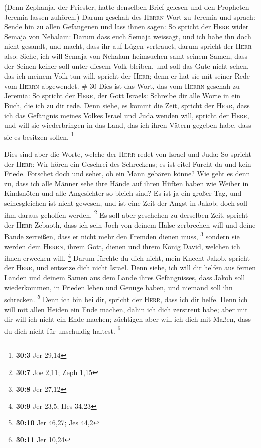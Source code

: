  (Denn Zephanja, der Priester, hatte denselben Brief
gelesen und den Propheten Jeremia lassen zuhören.)  Darum
geschah des \textsc{Herrn} Wort zu Jeremia und sprach: 
Sende hin zu allen Gefangenen und lass ihnen sagen: So spricht der
\textsc{Herr} wider Semaja von Nehalam: Darum dass euch Semaja weissagt,
und ich habe ihn doch nicht gesandt, und macht, dass ihr auf Lügen
vertrauet,  darum spricht der \textsc{Herr} also: Siehe,
ich will Semaja von Nehalam heimsuchen samt seinem Samen, dass der
Seinen keiner soll unter diesem Volk bleiben, und soll das Gute nicht
sehen, das ich meinem Volk tun will, spricht der \textsc{Herr}; denn er
hat sie mit seiner Rede vom \textsc{Herrn} abgewendet. \# 30
 Dies ist das Wort, das vom \textsc{Herrn} geschah zu
Jeremia:  So spricht der \textsc{Herr}, der Gott Israels:
Schreibe dir alle Worte in ein Buch, die ich zu dir rede. 
Denn siehe, es kommt die Zeit, spricht der \textsc{Herr}, dass ich das
Gefängnis meines Volkes Israel und Juda wenden will, spricht der
\textsc{Herr}, und will sie wiederbringen in das Land, das ich ihren
Vätern gegeben habe, dass sie es besitzen sollen. \footnote{\textbf{30:3}
  Jer 29,14}

 Dies sind aber die Worte, welche der \textsc{Herr} redet
von Israel und Juda:  So spricht der \textsc{Herr}: Wir
hören ein Geschrei des Schreckens; es ist eitel Furcht da und kein
Friede.  Forschet doch und sehet, ob ein Mann gebären
könne? Wie geht es denn zu, dass ich alle Männer sehe ihre Hände auf
ihren Hüften haben wie Weiber in Kindsnöten und alle Angesichter so
bleich sind?  Es ist ja ein großer Tag, und seinesgleichen
ist nicht gewesen, und ist eine Zeit der Angst in Jakob; doch soll ihm
daraus geholfen werden. \footnote{\textbf{30:7} Joe 2,11; Zeph 1,15}
 Es soll aber geschehen zu derselben Zeit, spricht der
\textsc{Herr} Zebaoth, dass ich sein Joch von deinem Halse zerbrechen
will und deine Bande zerreißen, dass er nicht mehr den Fremden dienen
muss, \footnote{\textbf{30:8} Jer 27,12}  sondern sie
werden dem \textsc{Herrn}, ihrem Gott, dienen und ihrem König David,
welchen ich ihnen erwecken will. \footnote{\textbf{30:9} Jer 23,5; Hes
  34,23}  Darum fürchte du dich nicht, mein Knecht Jakob,
spricht der \textsc{Herr}, und entsetze dich nicht Israel. Denn siehe,
ich will dir helfen aus fernen Landen und deinem Samen aus dem Lande
ihres Gefängnisses, dass Jakob soll wiederkommen, in Frieden leben und
Genüge haben, und niemand soll ihn schrecken. \footnote{\textbf{30:10}
  Jer 46,27; Jes 44,2}  Denn ich bin bei dir, spricht der
\textsc{Herr}, dass ich dir helfe. Denn ich will mit allen Heiden ein
Ende machen, dahin ich dich zerstreut habe; aber mit dir will ich nicht
ein Ende machen; züchtigen aber will ich dich mit Maßen, dass du dich
nicht für unschuldig haltest. \footnote{\textbf{30:11} Jer 10,24}

